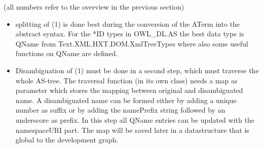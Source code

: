 \documentclass[11pt,a4paper]{article}
\begin{document}
(all numbers refer to the overview in the previous section)

\begin{itemize}
\item 
  splitting of (1) is done best during the conversion of the ATerm
  into the abstract syntax. For the *ID types in OWL\_DL.AS the best
  data type is QName from Text.XML.HXT.DOM.XmlTreeTypes where also
  some useful functions on QName are defined.
  
\item Disambiguation of (1) must be done in a second step, which must
  traverse the whole AS-tree. The traversal function (in its own
  class) needs a map as parameter which stores the mapping between
  original and disambiguated name. A disambiguated name can be formed
  either by adding a unique number as suffix or by adding the
  namePrefix string followed by an underscore as prefix.  In this step
  all QName entries can be updated with the namespaceURI part.  The
  map will be saved later in a datastructure that is global to the
  development graph.

\end{itemize}
\end{document}
